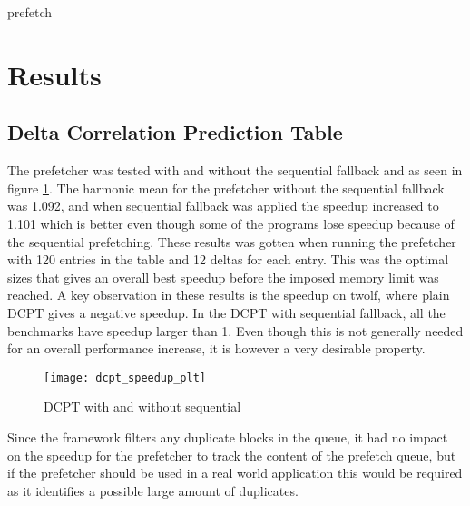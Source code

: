 \documentclass[12pt,journal,compsoc]{IEEEtran}
\begin{document}
\begin{algorithm}
\dontprintsemicolon
{}

\caption{prefetch\label{pre}}
\end{algorithm}

\section{Results}
\subsection{Delta Correlation Prediction Table}
The prefetcher was tested with and without the sequential fallback and as seen in figure \ref{fig:dcptspeed}. The harmonic mean for the prefetcher without the sequential fallback was 1.092, and when sequential fallback was applied the speedup increased to 1.101 which is better even though some of the programs lose speedup because of the sequential prefetching. These results was gotten when running the prefetcher with 120 entries in the table and 12 deltas for each entry. This was the optimal sizes that gives an overall best speedup before the
imposed memory limit was reached. %
A key observation in these results is the speedup on twolf, where plain DCPT gives a negative speedup. In the DCPT with sequential fallback, all the benchmarks have speedup larger than 1. Even though this is not generally needed for
an overall performance increase, it is however a very desirable property.



\begin{figure}
\begin{center}
\texttt{[image: dcpt\_speedup\_plt]}
\end{center}
\caption{\label{fig:dcptspeed} DCPT with and without sequential}
\end{figure}

Since the framework filters any duplicate blocks in the queue,
it had no impact on the speedup for the prefetcher to track the content of
the prefetch queue, but if the prefetcher should be used in a real world
application this would be required as it identifies a possible large amount
of duplicates.
\end{document}
